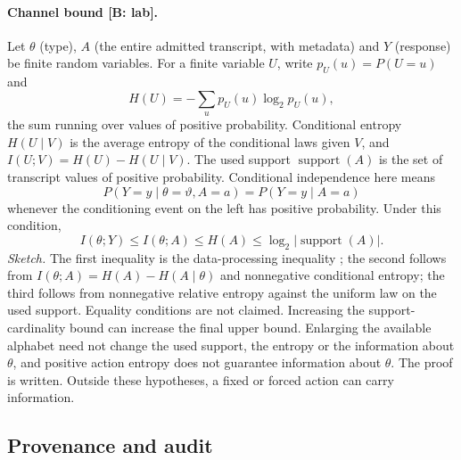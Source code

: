 \documentclass[pdflatex,sn-basic]{sn-jnl}%
\newcommand{\slot}[1]{}%
\begin{document}
\begin{appendices}
\paragraph{Channel bound [B: lab].} Let $\theta$ (type), $A$ (the entire admitted transcript, with metadata) and $Y$ (response) be finite random variables. For a finite variable $U$, write $p_U(u)=P(U=u)$ and
\[
H(U)=-\sum_{u}p_U(u)\log_2 p_U(u),
\]
the sum running over values of positive probability.
Conditional entropy $H(U\mid V)$ is the average entropy of the conditional laws given $V$, and $I(U;V)=H(U)-H(U\mid V)$. The used support $\operatorname{support}(A)$ is the set of transcript values of positive probability. Conditional independence here means
\[
P(Y=y\mid\theta=\vartheta,A=a)=P(Y=y\mid A=a)
\]
whenever the conditioning event on the left has positive probability. Under this condition,
\[
I(\theta;Y)\le I(\theta;A)\le H(A)\le\log_2|\operatorname{support}(A)|.
\]
\emph{Sketch.} The first inequality is the data-processing inequality \citep{cover2005}; the second follows from $I(\theta;A)=H(A)-H(A\mid\theta)$ and nonnegative conditional entropy; the third follows from nonnegative relative entropy against the uniform law on the used support. Equality conditions are not claimed. Increasing the support-cardinality bound can increase the final upper bound. Enlarging the available alphabet need not change the used support, the entropy or the information about $\theta$, and positive action entropy does not guarantee information about $\theta$. The proof is written. Outside these hypotheses, a fixed or forced action can carry information.
\subsection{Provenance and audit}\label{app:provenance}

\slot{A.4}

\end{appendices}
\end{document}
